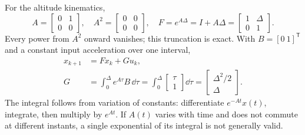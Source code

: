 For the altitude kinematics,
\begin{equation}
A=\begin{bmatrix}0&1\\0&0\end{bmatrix},\quad
A^2=\begin{bmatrix}0&0\\0&0\end{bmatrix},\quad
F=e^{A\Delta}=I+A\Delta=\begin{bmatrix}1&\Delta\\0&1\end{bmatrix}.
\end{equation}
Every power from $A^2$ onward vanishes; this truncation is exact. With
$B=[0\ 1]^{\mathsf T}$ and a constant input acceleration over one interval,
\begin{align}
x_{k+1}&=Fx_k+Gu_k,\\
G&=\int_0^\Delta e^{A\tau}B\,\dd\tau
=\int_0^\Delta\begin{bmatrix}\tau\\1\end{bmatrix}\dd\tau
=\begin{bmatrix}\Delta^2/2\\\Delta\end{bmatrix}.
\end{align}
The integral follows from variation of constants: differentiate
$e^{-At}x(t)$, integrate, then multiply by $e^{At}$. If $A(t)$ varies with
time and does not commute at different instants, a single exponential of
its integral is not generally valid.

